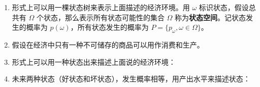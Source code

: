 

\ifdefined\WJHandoutKnowledge

\begin{tcolorbox}[knowledge,title=2.1 经济环境]
\begin{enumerate}

\item 形式上可以用一棵状态树来表示上面描述的经济环境。用 $\omega$ 标识状态，假设总共有 $\Omega$ 个状态，那么表示所有状态可能性的集合 $\Omega$ 称为\textbf{状态空间}。记状态发生的概率为 $p(\omega)$，所有状态发生的概率为 $P=\{p_{\omega}, \omega\in\Omega\}$。

\item 假设在经济中只有一种不可储存的商品可以用作消费和生产。
\item 形式上可以用一种状态出来描述上面说的经济环境：
\begin{center}
\end{center}
\item 未来两种状态（好状态和坏状态），发生概率相等，用产出水平来描述状态：
\begin{center}
    \end{center}
\end{enumerate}
\end{tcolorbox}


